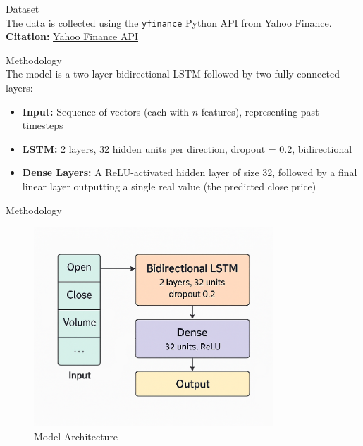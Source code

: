 \documentclass[9pt]{beamer}
\begin{document}
\begin{frame}{Dataset}
    \\[0.3cm]
    The data is collected using the \texttt{yfinance} Python API from Yahoo Finance.\\[0.15cm]
    \textbf{Citation:}
    \href{https://pypi.org/project/yfinance/}{Yahoo Finance API}

\end{frame}

\begin{frame}{Methodology}
    \\[0.3cm]
    The model is a two-layer bidirectional LSTM followed by two fully connected
    layers:
    \begin{itemize}
        \item \textbf{Input:} Sequence of vectors (each with $n$ features),
              representing past timesteps
        \item \textbf{LSTM:} 2 layers, 32 hidden units per direction, dropout =
              0.2, bidirectional
        \item \textbf{Dense Layers:} A ReLU-activated hidden layer of size 32,
              followed by a final linear layer outputting a single real value
              (the predicted
              close price)
    \end{itemize}
\end{frame}

\begin{frame}{Methodology}
    \begin{figure}[htbp]
        \centering
        \includegraphics[width=0.8\textwidth]{model3.png}
        \caption{Model Architecture}
    \end{figure}
\end{frame}
\end{document}
